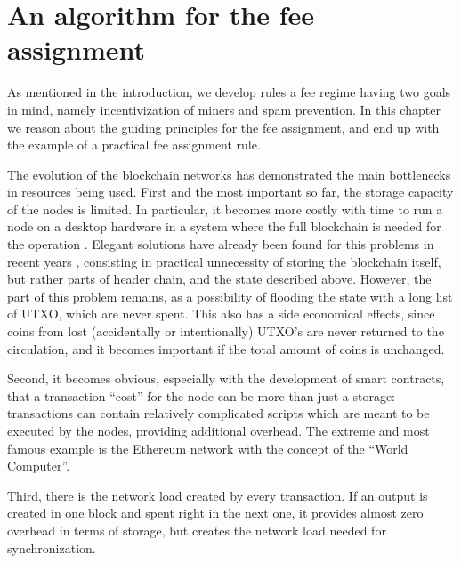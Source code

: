 \documentclass[]{llncs}   %
\newcommand{\authnote}[2]{\marginpar{\parbox{\marginparwidth}{\tiny %
  \textsf{#1 {\textcolor{blue}{notes: #2}}}}}%
  \textcolor{blue}{\textbf{\dag}}}
\newcommand{\authnote}[2]{
  \textsf{#1\textcolor{blue}{ #2}}}
\newcommand{\authnote}[2]{}
\newcommand{\vk}[1]{{\authnote{\textcolor{red}{V:}}{#1}}}
\begin{document}
\section{An algorithm for the fee assignment}
\label{sec:algorithm}

As mentioned in the introduction, we develop rules a fee regime having two goals in mind, namely incentivization of miners and
spam prevention.
In this chapter we reason about the guiding  principles for the fee assignment, and end up with the example of a practical fee assignment rule.

The evolution of the blockchain networks has demonstrated the main bottlenecks in resources being used. First and the most
important so far, the storage capacity of the nodes is limited. In particular, it
becomes more costly with time to run a node on a desktop hardware in a system 
where the full blockchain is needed for the operation \vk{more details}.
Elegant solutions have already been found for this problems in recent years
\vk{citations}, consisting in practical unnecessity of storing the blockchain
itself, but rather parts of header chain, and the state described above.
However, the part of this problem remains, as a possibility of flooding
the state with a long list of UTXO, which are never spent. This also has a side
economical effects, since coins from lost (accidentally or intentionally) UTXO's
are never returned to the circulation, and it becomes important if the total
amount of coins is unchanged.

Second, it becomes obvious, especially with the development of smart contracts,
that a transaction ``cost'' for the node can be more than just a storage:
transactions can contain relatively complicated scripts which are meant to be
executed by the nodes, providing additional overhead. The extreme and most
famous example is the Ethereum network with the concept of the ``World
Computer''. %

Third, there is the network load created by every transaction. If
an output is created in one block and spent right in the next one, it provides
almost zero overhead in terms of storage, but creates the network load
needed for synchronization.
\end{document}
